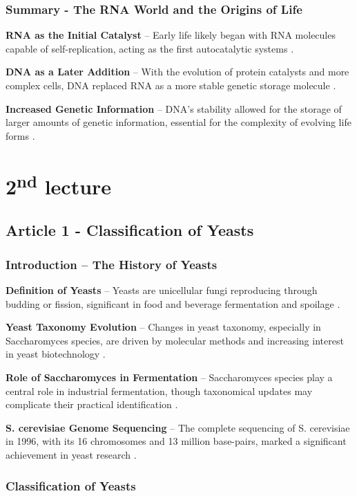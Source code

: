\subsubsection{Summary - The RNA World and the Origins of Life}

\textbf{RNA as the Initial Catalyst} – Early life likely began with RNA molecules capable of self-replication, acting as the first autocatalytic systems \cite*{L1-Chapter6}.

\textbf{DNA as a Later Addition} – With the evolution of protein catalysts and more complex cells, DNA replaced RNA as a more stable genetic storage molecule \cite*{L1-Chapter6}.

\textbf{Increased Genetic Information} – DNA’s stability allowed for the storage of larger amounts of genetic information, essential for the complexity of evolving life forms \cite*{L1-Chapter6}.

\section{2\textsuperscript{nd} lecture}

\subsection{Article 1 - Classification of Yeasts}
\subsubsection*{Introduction – The History of Yeasts}

\textbf{Definition of Yeasts} – Yeasts are unicellular fungi reproducing through budding or fission, significant in food and beverage fermentation and spoilage \cite*{L2-YeastClass}.

\textbf{Yeast Taxonomy Evolution} – Changes in yeast taxonomy, especially in Saccharomyces species, are driven by molecular methods and increasing interest in yeast biotechnology \cite*{L2-YeastClass}.

\textbf{Role of Saccharomyces in Fermentation} – Saccharomyces species play a central role in industrial fermentation, though taxonomical updates may complicate their practical identification \cite*{L2-YeastClass}.

\textbf{S. cerevisiae Genome Sequencing} – The complete sequencing of S. cerevisiae in 1996, with its 16 chromosomes and 13 million base-pairs, marked a significant achievement in yeast research \cite*{L2-YeastClass}.
\subsubsection{Classification of Yeasts}

